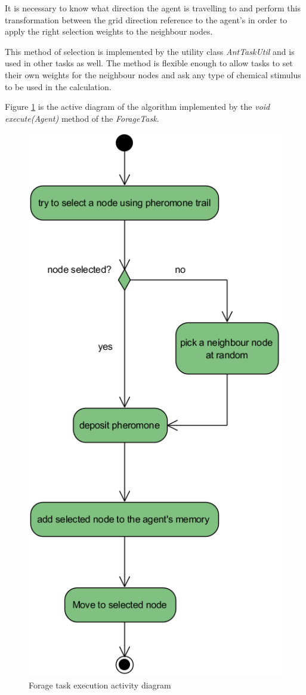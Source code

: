 It is necessary to know what direction the agent is travelling to and perform this transformation between the grid direction reference to the agent's in order to apply the right selection weights to the neighbour nodes.

This method of selection is implemented by the utility class \emph{AntTaskUtil} and is used in other tasks as well. The method is flexible enough to allow tasks to set their own weights for the neighbour nodes and ask any type of chemical stimulus to be used in the calculation.

Figure \ref{fig:forage-activity} is the active diagram of the algorithm implemented by the \emph{void execute(Agent)} method of the \emph{ForageTask}.

\begin{figure}[H]
  \centering
  \includegraphics[width=0.6\linewidth]{gfx/uml-act-forage.png}
  \caption{Forage task execution activity diagram}
  \label{fig:forage-activity}
\end{figure}


